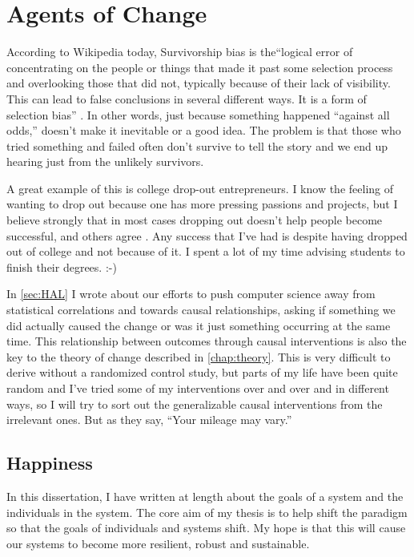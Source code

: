\chapter{Agents of Change}
\label{chap:agent}

According to Wikipedia today, Survivorship bias is the``logical error of concentrating on the people or things that made it past some selection process and overlooking those that did not, typically because of their lack of visibility. This can lead to false conclusions in several different ways. It is a form of selection bias'' \cite{wikipedia:survivorshipbias}. In other words, just because something happened ``against all odds,'' doesn't make it inevitable or a good idea. The problem is that those who tried something and failed often don't survive to tell the story and we end up hearing just from the unlikely survivors.

A great example of this is college drop-out entrepreneurs. I know the feeling of wanting to drop out because one has more pressing passions and projects, but I believe strongly that in most cases dropping out doesn't help people become successful, and others agree \cite{Zimmer:2013aa}. Any success that I've had is despite having dropped out of college and not because of it. I spent a lot of my time advising students to finish their degrees. :-)

In \autoref{sec:HAL} I wrote about our efforts to push computer science away from statistical correlations and towards causal relationships, asking if something we did actually caused the change or was it just something occurring at the same time. This relationship between outcomes through causal interventions is also the key to the theory of change described in \autoref{chap:theory}. This is very difficult to derive without a randomized control study, but parts of my life have been quite random and I've tried some of my interventions over and over and in different ways, so I will try to sort out the generalizable causal interventions from the irrelevant ones. But as they say, ``Your mileage may vary.''

\section{Happiness}

In this dissertation, I have written at length about the goals of a system and the individuals in the system. The core aim of my thesis is to help shift the paradigm so that the goals of individuals and systems shift. My hope is that this will cause our systems to become more resilient, robust and sustainable.

